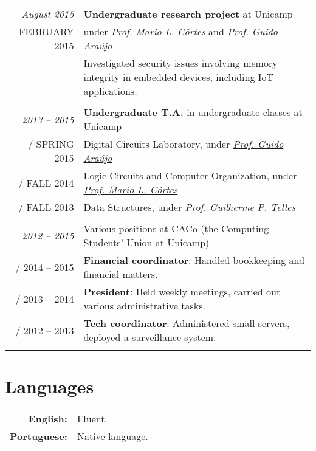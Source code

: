 \documentclass[a4paper,10pt]{article}
\makeatletter
\def\fakesc#1{%
  \begingroup%
  \xdef\fake@name{\csname\curr@fontshape/\f@size\endcsname}%
  \fontsize{\fontdimen8\fake@name}{\baselineskip}\selectfont%
  \uppercase{#1}%
  \endgroup%
}
\renewcommand{\textsc}{\fakesc}
\makeatother
\begin{document}
\begin{tabular}{r|p{11cm}}

  \emph{August 2015} & \textbf{Undergraduate research project} at Unicamp\\
  \textsc{February 2015} & under \href{http://www.ic.unicamp.br/~cortes/}{\emph{Prof. Mario L. Côrtes}} and \href{http://guidoaraujo.wordpress.com/}{\emph{Prof. Guido Araújo}}\\
                     & \footnotesize {Investigated security issues involving memory integrity in embedded devices, including IoT applications.}\\
  \multicolumn{2}{c}{} \\

  \emph{2013 -- 2015} & \textbf{Undergraduate T.A.} in undergraduate classes at Unicamp \\
  \textsc{Spring 2015} & \footnotesize{Digital Circuits Laboratory, under \href{http://guidoaraujo.wordpress.com/}{\emph{Prof. Guido Araújo}}}\\
  \textsc{Fall 2014} & \footnotesize{Logic Circuits and Computer Organization, under \href{http://www.ic.unicamp.br/~cortes/}{\emph{Prof. Mario L. Côrtes}}}\\
  \textsc{Fall 2013} & \footnotesize{Data Structures, under \href{http://ic.unicamp.br/~gpt/}{\emph{Prof. Guilherme P. Telles}}}\\
  \multicolumn{2}{c}{}\\

  \emph{2012 -- 2015} & Various positions at \href{http://www.caco.ic.unicamp.br}{CACo} \footnotesize{(the Computing Students' Union at Unicamp)} \\
  \textsc{2014 -- 2015} & \footnotesize{\textbf{Financial coordinator}: Handled bookkeeping and financial matters.}\\
  \textsc{2013 -- 2014} & \footnotesize{\textbf{President}: Held weekly meetings, carried out various administrative tasks.}\\
  \textsc{2012 -- 2013} & \footnotesize{\textbf{Tech coordinator}: Administered small servers, deployed a surveillance system.}\\
  \multicolumn{2}{c}{} \\

\end{tabular}

\section{Languages}

\begin{tabularx}{\textwidth}{rXr}
  \textbf{English:} & Fluent. \\
  \textbf{Portuguese:} & Native language.\\
\end{tabularx}
\end{document}
